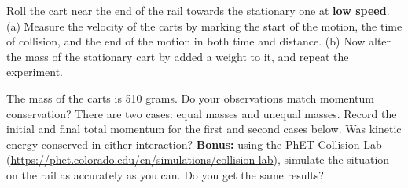 \documentclass{article}
\begin{document}
Roll the cart near the end of the rail towards the stationary one at \textbf{low speed}.  (a) Measure the velocity of the carts by marking the start of the motion, the time of collision, and the end of the motion in both time and distance.  (b) Now alter the mass of the stationary cart by added a weight to it, and repeat the experiment.  \\ \vspace{1.5cm}

The mass of the carts is 510 grams.  Do your observations match momentum conservation?  There are two cases: equal masses and unequal masses.  Record the initial and final total momentum for the first and second cases below.  Was kinetic energy conserved in either interaction?  \textbf{Bonus:} using the PhET Collision Lab (\url{https://phet.colorado.edu/en/simulations/collision-lab}), simulate the situation on the rail as accurately as you can.  Do you get the same results?
\end{document}
